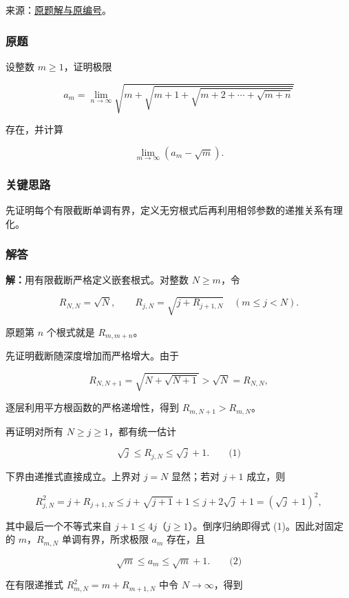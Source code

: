 \documentclass[11pt,a4paper]{article}
\begin{document}
来源：\href{https://zj139.github.io/math-notes/problems/e7f87e98efda5bacdd444c79/\#问题-b35}{原题解与原编号}。

\subsubsection{原题}\label{ux539fux9898-2}

设整数 \(m\ge1\)，证明极限

\[
a_m=\lim_{n\to\infty}
\sqrt{m+\sqrt{m+1+\sqrt{m+2+\cdots+\sqrt{m+n}}}}
\]

存在，并计算

\[
\lim_{m\to\infty}(a_m-\sqrt m).
\]

\subsubsection{关键思路}\label{ux5173ux952eux601dux8def-2}

先证明每个有限截断单调有界，定义无穷根式后再利用相邻参数的递推关系有理化。

\subsubsection{解答}\label{ux89e3ux7b54-2}

\textbf{解：}用有限截断严格定义嵌套根式。对整数 \(N\ge m\)，令

\[
R_{N,N}=\sqrt N,\qquad
R_{j,N}=\sqrt{j+R_{j+1,N}}\quad(m\le j<N).
\]

原题第 \(n\) 个根式就是 \(R_{m,m+n}\)。

先证明截断随深度增加而严格增大。由于

\[
R_{N,N+1}=\sqrt{N+\sqrt{N+1}}>\sqrt N=R_{N,N},
\]

逐层利用平方根函数的严格递增性，得到 \(R_{m,N+1}>R_{m,N}\)。

再证明对所有 \(N\ge j\ge1\)，都有统一估计

\[
\sqrt j\le R_{j,N}\le\sqrt j+1.
\qquad\text{(1)}
\]

下界由递推式直接成立。上界对 \(j=N\) 显然；若对 \(j+1\) 成立，则

\[
R_{j,N}^2=j+R_{j+1,N}
\le j+\sqrt{j+1}+1
\le j+2\sqrt j+1=(\sqrt j+1)^2,
\]

其中最后一个不等式来自 \(j+1\le4j\)（\(j\ge1\)）。倒序归纳即得式
(1)。因此对固定的 \(m\)，\(R_{m,N}\) 单调有界，所求极限 \(a_m\) 存在，且

\[
\sqrt m\le a_m\le\sqrt m+1.
\qquad\text{(2)}
\]

在有限递推式 \(R_{m,N}^2=m+R_{m+1,N}\) 中令 \(N\to\infty\)，得到
\end{document}
